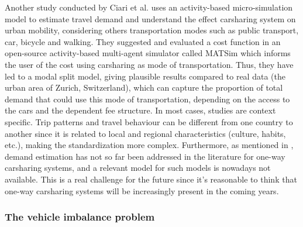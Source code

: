 \begin{bibunit}[ieeetr]
Another study conducted by Ciari et al. \cite{ciari_estimation_2013} uses an activity-based micro-simulation model to estimate travel demand and understand the effect carsharing system on urban mobility, considering others transportation modes such as public transport, car, bicycle and walking.
They suggested and evaluated a cost function in an open-source activity-based multi-agent simulator called MATSim \cite{matsim_webPage} which informs the user of the cost using carsharing as mode of transportation.
Thus, they have led to a modal split model, giving plausible results compared to real data (the urban area of Zurich, Switzerland), which can capture the proportion of total demand that could use this mode of transportation, depending on the access to the cars and the dependent fee structure.
In most cases, studies are context specific.
Trip patterns and travel behaviour can be different from one country to another since it is related to local and regional characteristics (culture, habits, etc.), making the standardization more complex.
Furthermore, as mentioned in \cite{jorge_carsharing_2013}, demand estimation has not so far been addressed in the literature for one-way carsharing systems, and a relevant model for such models is nowadays not available.
This is a real challenge for the future since it's reasonable to think that one-way carsharing systems will be increasingly present in the coming years.

\subsubsection{The vehicle imbalance problem}


\end{bibunit}
